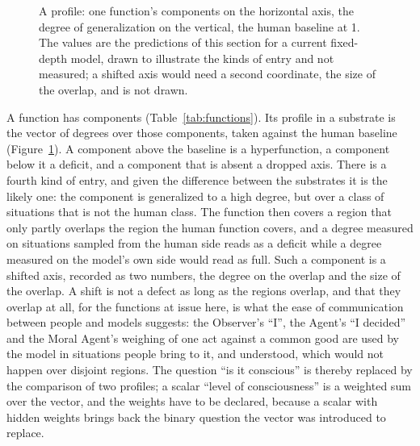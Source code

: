 \begin{figure}[t]
\centering
{}
\caption{A profile: one function's components on the horizontal axis, the degree of generalization on
the vertical, the human baseline at 1. The values are the predictions of this section for a current
fixed-depth model, drawn to illustrate the kinds of entry and not measured; a shifted axis would need a
second coordinate, the size of the overlap, and is not drawn.}
\label{fig:profile}
\end{figure}

A function has components (Table~\ref{tab:functions}). Its profile in a substrate is the vector of
degrees over those components, taken against the human baseline (Figure~\ref{fig:profile}). A
component above the baseline is a hyperfunction, a component below it a deficit, and a component that
is absent a dropped axis. There is a fourth kind of entry, and given the difference between the
substrates it is the likely one: the component is generalized to a high degree, but over a class of
situations that is not the human class. The function then covers a region that only partly overlaps
the region the human function covers, and a degree measured on situations sampled from the human side
reads as a deficit while a degree measured on the model's own side would read as full. Such a
component is a shifted axis, recorded as two numbers, the degree on the overlap and the size of the
overlap. A shift is not a defect as long as the regions overlap, and that they overlap at all, for the
functions at issue here, is what the ease of communication between people and models suggests: the
Observer's ``I'', the Agent's ``I decided'' and the Moral Agent's weighing of one act against a common
good are used by the model in situations people bring to it, and understood, which would not happen
over disjoint regions. The question ``is it conscious'' is thereby replaced by the comparison of two
profiles; a scalar ``level of consciousness'' is a weighted sum over the vector, and the weights have
to be declared, because a scalar with hidden weights brings back the binary question the vector was
introduced to replace.

